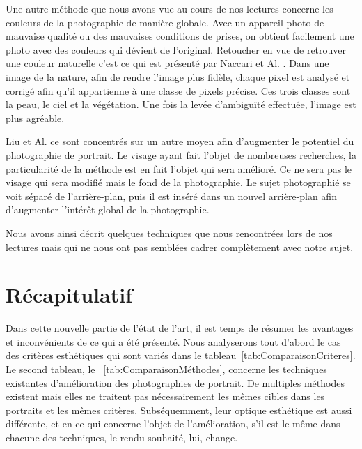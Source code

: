 \documentclass[11pt, french]{report-rd-info}
\begin{document}
Une autre méthode que nous avons vue au cours de nos lectures concerne les couleurs de la photographie de manière globale. Avec un appareil photo de mauvaise qualité ou des mauvaises conditions de prises, on obtient facilement une photo avec des couleurs qui dévient de l’original. Retoucher en vue de retrouver une couleur naturelle c'est ce qui est présenté par Naccari et Al. \cite{Naccari}. Dans une image de la nature, afin de rendre l’image plus fidèle, chaque pixel est analysé et corrigé afin qu’il appartienne à une classe de pixels précise. Ces trois classes sont la peau, le ciel et la végétation. Une fois la levée d’ambiguïté effectuée, l’image est plus agréable.

Liu et Al. \cite{Liu2007} ce sont concentrés sur un autre moyen afin d’augmenter le potentiel du photographie de portrait. Le visage ayant fait l’objet de nombreuses recherches, la particularité de la méthode est en fait l’objet qui sera amélioré. Ce ne sera pas le visage qui sera modifié mais le fond de la photographie. Le sujet photographié se voit séparé de l’arrière-plan, puis il est inséré dans un nouvel arrière-plan afin d’augmenter l’intérêt global de la photographie.

Nous avons ainsi décrit quelques techniques que nous rencontrées lors de nos lectures mais qui ne nous ont pas semblées cadrer complètement avec notre sujet.


\section{Récapitulatif}
Dans cette nouvelle partie de l'état de l'art, il est temps de résumer les avantages et inconvénients de ce qui a été présenté.
Nous analyserons tout d'abord le cas des critères esthétiques qui sont variés dans le tableau~\ref{tab:ComparaisonCriteres}. Le second tableau, le ~\ref{tab:ComparaisonMéthodes}, concerne les techniques existantes d'amélioration des photographies de portrait. De multiples méthodes existent mais elles ne traitent pas nécessairement les mêmes cibles dans les portraits et les mêmes critères. Subséquemment, leur optique esthétique est aussi différente, et en ce qui concerne l'objet de l'amélioration, s'il est le même dans chacune des techniques, le rendu souhaité, lui, change.
\end{document}
